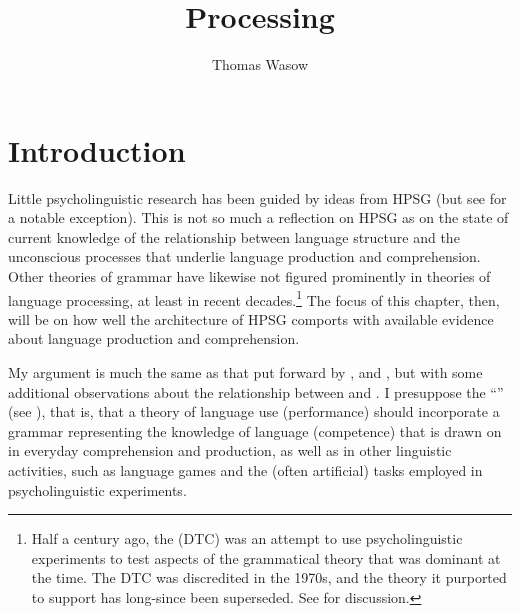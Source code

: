 \documentclass[output=paper,biblatex,babelshorthands,newtxmath,draftmode,colorlinks,citecolor=brown]{langscibook}
\title{Processing}
\author{Thomas Wasow\affiliation{Stanford University}}
\begin{document}
\maketitle
\label{chap-processing}

\section{Introduction}

Little psycholinguistic research has been guided by ideas from HPSG (but see \citealt{Konieczny96a-u} for a notable exception).  This is not so much a reflection on HPSG as on the state of current knowledge of the relationship between language structure and the unconscious processes that underlie language production and comprehension.  Other theories of grammar have likewise not figured prominently in theories of language processing, at least in recent decades.\footnote{Half a century ago, the  (DTC) was an attempt to use psycholinguistic experiments to test aspects of the grammatical theory that was dominant at the time.  The DTC was discredited in the 1970s, and the theory it purported to support has long-since been superseded.  See \citet{FBG74a-u} for discussion.}  The focus of this chapter, then, will be on how well the architecture of HPSG comports with available evidence about language production and comprehension.  

My argument is much the same as that put forward by \citet[Chapter~9]{SWB2003a}, and \citet{SW2011a,SW2015a}, but with some additional observations about the relationship between  and . I presuppose the ``'' (see \citealt[Chapter~1]{Chomsky65a}), that is, that a theory of language use (performance) should incorporate a grammar representing the knowledge of language (competence) that is drawn on in everyday comprehension and production, as well as in other linguistic activities, such as language games and the (often artificial) tasks employed in psycholinguistic experiments.  
\end{document}
